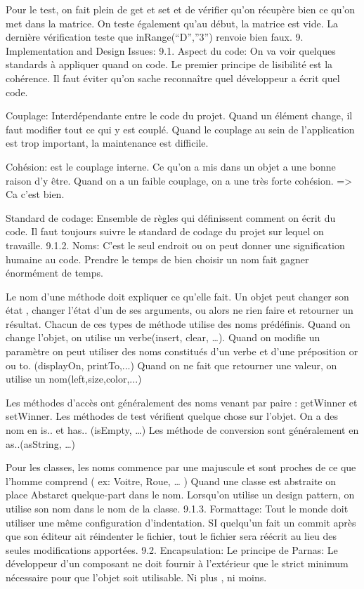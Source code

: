 Pour le test, on fait plein de get et set et de vérifier qu’on récupère bien ce qu’on met dans la matrice. On teste également qu’au début, la matrice est vide. La dernière vérification teste que inRange(“D”,”3”) renvoie bien faux.
9. Implementation and Design Issues:
9.1. Aspect du code:
On va voir quelques standards à appliquer quand on code.
Le premier principe de lisibilité est la cohérence. Il faut éviter qu’on sache reconnaître quel développeur a écrit quel code.

Couplage: Interdépendante entre le code du projet. Quand un élément change, il faut modifier tout ce qui y est couplé. Quand le couplage au sein de l’application est trop important, la maintenance est difficile.

Cohésion: est le couplage interne. Ce qu’on a mis dans un objet a une bonne raison d’y être.
Quand on a un faible couplage, on a une très forte cohésion. => Ca c’est bien.

Standard de codage: Ensemble de règles qui définissent comment on écrit du code.
Il faut toujours suivre le standard de codage du projet sur lequel on travaille.
9.1.2. Noms:
C’est le seul endroit ou on peut donner une signification humaine au code.
Prendre le temps de bien choisir un nom fait gagner énormément de temps.

Le nom d’une méthode doit expliquer ce qu’elle fait. Un objet peut changer son état , changer l’état d’un de ses arguments, ou alors ne rien faire et retourner un résultat. Chacun de ces types de méthode utilise des noms prédéfinis.
Quand on change l’objet, on utilise un verbe(insert, clear, …).
Quand on modifie un paramètre on peut utiliser des noms constitués d’un verbe et d’une préposition or ou to. (displayOn, printTo,...) 
Quand on ne fait que retourner une valeur, on utilise un nom(left,size,color,...)

Les méthodes d’accès ont généralement des noms venant par paire : getWinner et setWinner.
Les méthodes de test vérifient quelque chose sur l’objet. On a des nom en is.. et has.. (isEmpty, …)
Les méthode de conversion sont généralement en as..(asString, …)

Pour les classes, les noms commence par une majuscule et sont proches de ce que l’homme comprend ( ex: Voitre, Roue, … )
Quand une classe est abstraite on place Abstarct quelque-part dans le nom.
Lorsqu’on utilise un design pattern, on utilise son nom dans le nom de la classe.
9.1.3. Formattage:
Tout le monde doit utiliser une même configuration d’indentation.
SI quelqu’un fait un commit après que son éditeur ait réindenter le fichier, tout le fichier sera réécrit au lieu des seules modifications apportées.
9.2. Encapsulation:
Le principe de Parnas: Le développeur d’un composant ne doit fournir à l’extérieur que le strict minimum nécessaire pour que l’objet soit utilisable. Ni plus , ni moins.

